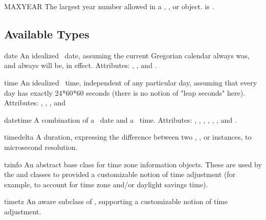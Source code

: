 \begin{datadesc}{MAXYEAR}
  The largest year number allowed in a , ,
  or  object.   is .
\end{datadesc}


\subsection{Available Types}

\begin{classdesc*}{date}
  An idealized \naive\ date, assuming the current Gregorian calendar
  always was, and always will be, in effect.
  Attributes: , , and .
\end{classdesc*}

\begin{classdesc*}{time}
  An idealized \naive\ time, independent of any particular day, assuming
  that every day has exactly 24*60*60 seconds (there is no notion
  of "leap seconds" here).
  Attributes: , , , and
\end{classdesc*}

\begin{classdesc*}{datetime}
  A combination of a \naive\ date and a \naive\ time.
  Attributes: , , ,
              , , ,
              and .
\end{classdesc*}

\begin{classdesc*}{timedelta}
  A duration, expressing the difference between two ,
  , or  instances, to microsecond
  resolution.
\end{classdesc*}

\begin{classdesc*}{tzinfo}
  An abstract base class for time zone information objects.  These
  are used by the    and  classes to
  provided a customizable notion of time adjustment (for example, to
  account for time zone and/or daylight savings time).
\end{classdesc*}

\begin{classdesc*}{timetz}
  An aware subclass of , supporting a customizable notion of
  time adjustment.
\end{classdesc*}

